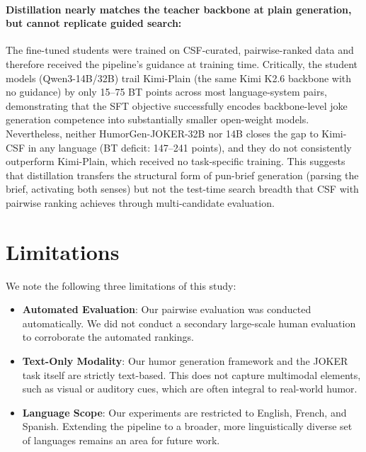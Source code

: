\documentclass[]{ceurart}
\begin{document}
\paragraph{Distillation nearly matches the teacher backbone at plain generation,
but cannot replicate guided search:}
The fine-tuned students were trained on CSF-curated, pairwise-ranked data and
therefore received the pipeline's guidance at training time.
Critically, the student models (Qwen3-14B/32B) trail Kimi-Plain (the same
Kimi K2.6 backbone with no guidance) by only 15--75 BT points across most
language-system pairs, demonstrating that the SFT objective successfully
encodes backbone-level joke generation competence into substantially smaller
open-weight models.
Nevertheless, neither HumorGen-JOKER-32B nor 14B closes the gap to Kimi-CSF in
any language (BT deficit: 147--241 points), and they do not consistently
outperform Kimi-Plain, which received no task-specific training.
This suggests that distillation transfers the structural form of
pun-brief generation (parsing the brief, activating both senses) but not the
test-time search breadth that CSF with pairwise ranking achieves through
multi-candidate evaluation.

\section{Limitations}
\label{sec:limitations}
We note the following three limitations of this study:
\begin{itemize}
    \item \textbf{Automated Evaluation}: Our pairwise evaluation was conducted automatically. We did not conduct a secondary large-scale human evaluation to corroborate the automated rankings.
    \item \textbf{Text-Only Modality}: Our humor generation framework and the JOKER task itself are strictly text-based. This does not capture multimodal elements, such as visual or auditory cues, which are often integral to real-world humor.
    \item \textbf{Language Scope}: Our experiments are restricted to English, French, and Spanish. Extending the pipeline to a broader, more linguistically diverse set of languages remains an area for future work.
\end{itemize}

\end{document}
